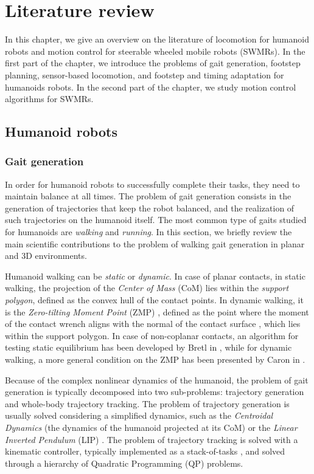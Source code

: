 \chapter{Literature review}
In this chapter, we give an overview on the literature of locomotion for
humanoid robots and motion control for
steerable wheeled mobile robots (SWMRs). In the first part of 
the chapter, we introduce the problems of 
gait generation, footstep planning, sensor-based locomotion, and footstep and 
timing adaptation for humanoids robots. In the second part of the chapter,
we study motion control algorithms for SWMRs.

\section{Humanoid robots}
\subsection{Gait generation}
In order for humanoid robots to successfully complete their tasks, they need to 
maintain balance at all times. The problem of gait generation consists in the
generation of trajectories that keep the robot balanced, and the realization of 
such trajectories on the humanoid itself. The most common type of gaits studied for 
humanoids are \textit{walking} and \textit{running}.
In this section, we briefly review the main 
scientific contributions to the problem of walking gait generation in 
planar and 3D environments.

Humanoid walking can be \textit{static} or \textit{dynamic}. In case of planar
contacts, in static walking, the 
projection of the \textit{Center of Mass} (CoM) lies within the
\textit{support polygon},
defined as the convex hull of the contact points. In dynamic walking, 
it is the \textit{Zero-tilting Moment Point} (ZMP) \cite{Vukobratovic1972ZMP},
defined as the point 
where the moment of the contact wrench aligns with the normal of the contact 
surface \cite{SardainBessonnet2004}, which lies within the support polygon.
In case of non-coplanar contacts,
an algorithm for testing static equilibrium has been developed by Bretl in
\cite{Bretl2008TestingStaticEquilibriumforLeggedRobots}, while for dynamic
walking, a more general
condition on the ZMP has been presented by Caron in
\cite{Caron2017TRO}.

Because of the complex nonlinear dynamics of the humanoid, the problem of gait 
generation is typically decomposed into two sub-problems: trajectory generation and 
whole-body trajectory tracking. The problem of trajectory generation is 
usually solved considering a simplified dynamics, such as the \textit{Centroidal
Dynamics} (the dynamics of the humanoid projected at its CoM)
\cite{Orin2013CentroidalDynamics} or the \textit{Linear Inverted Pendulum} (LIP)
\cite{Kajita1991LIP}. The problem of trajectory tracking is solved with a 
kinematic controller, typically implemented as a
stack-of-tasks \cite{Escande2014IJRR}, and solved through a hierarchy of 
Quadratic Programming (QP) problems.

